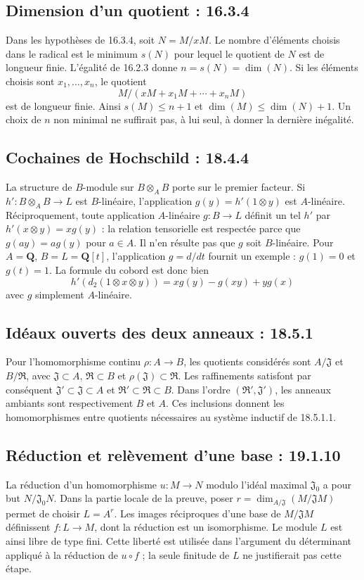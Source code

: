 \documentclass[11pt,a4paper]{article}
\begin{document}
\subsection{Dimension d'un quotient : 16.3.4}
\label{note:iv1-2}
Dans les hypothèses de 16.3.4, soit $N=M/xM$. Le nombre d'éléments
choisis dans le radical est le minimum $s(N)$ pour lequel le quotient
de $N$ est de longueur finie. L'égalité de 16.2.3 donne
$n=s(N)=\dim(N)$. Si les éléments choisis sont $x_1,\ldots,x_n$,
le quotient
\[
 M/(xM+x_1M+\cdots+x_nM)
\]
est de longueur finie. Ainsi $s(M)\leq n+1$ et
$\dim(M)\leq\dim(N)+1$. Un choix de $n$ non minimal ne suffirait
pas, à lui seul, à donner la dernière inégalité.

\subsection{Cochaines de Hochschild : 18.4.4}
\label{note:iv1-3}
La structure de $B$-module sur $B\otimes_A B$ porte sur le premier
facteur. Si $h':B\otimes_A B\to L$ est $B$-linéaire, l'application
$g(y)=h'(1\otimes y)$ est $A$-linéaire. Réciproquement, toute
application $A$-linéaire $g:B\to L$ définit un tel $h'$ par
$h'(x\otimes y)=xg(y)$ : la relation tensorielle est respectée parce
que $g(ay)=ag(y)$ pour $a\in A$.
Il n'en résulte pas que $g$ soit $B$-linéaire. Pour
$A=\mathbf Q$, $B=L=\mathbf Q[t]$, l'application $g=d/dt$ fournit
un exemple : $g(1)=0$ et $g(t)=1$.
La formule du cobord est donc bien
\[
 h'(d_2(1\otimes x\otimes y))=xg(y)-g(xy)+yg(x)
\]
avec $g$ simplement $A$-linéaire.

\subsection{Idéaux ouverts des deux anneaux : 18.5.1}
\label{note:iv1-4}
Pour l'homomorphisme continu $\rho:A\to B$, les quotients considérés
sont $A/\mathfrak J$ et $B/\mathfrak R$, avec
$\mathfrak J\subset A$, $\mathfrak R\subset B$ et
$\rho(\mathfrak J)\subset\mathfrak R$.
Les raffinements satisfont par conséquent
$\mathfrak J'\subset\mathfrak J\subset A$ et
$\mathfrak R'\subset\mathfrak R\subset B$.
Dans l'ordre $(\mathfrak R',\mathfrak J')$, les anneaux ambiants sont
respectivement $B$ et $A$. Ces inclusions donnent les homomorphismes
entre quotients nécessaires au système inductif de 18.5.1.1.

\subsection{Réduction et relèvement d'une base : 19.1.10}
\label{note:iv1-5}
La réduction d'un homomorphisme $u:M\to N$ modulo l'idéal maximal
$\mathfrak J_0$ a pour but $N/\mathfrak J_0N$.
Dans la partie locale de la preuve, poser
$r=\dim_{A/\mathfrak J}(M/\mathfrak JM)$ permet de choisir
$L=A^r$. Les images réciproques d'une base de $M/\mathfrak JM$
définissent $f:L\to M$, dont la réduction est un isomorphisme.
Le module $L$ est ainsi libre de type fini. Cette liberté est utilisée
dans l'argument du déterminant appliqué à la réduction de $u\circ f$ ;
la seule finitude de $L$ ne justifierait pas cette étape.
\end{document}
